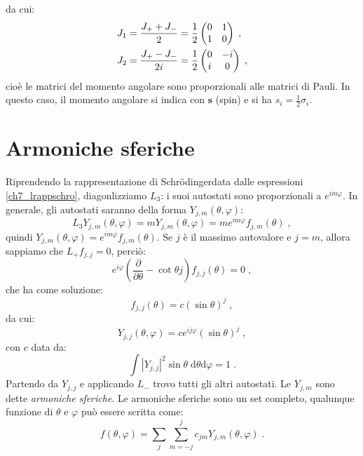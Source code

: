 \documentclass[12pt,a4paper]{report}
\theoremstyle{definition}
\numberwithin{equation}{section}
\newcommand{\diff}[1][]{\mathrm{d}#1}
\newcommand{\Sch}{Schrödinger}
\begin{document}
da cui:
\begin{align}
J_1=\frac{J_+ +J_-}{2}&=\frac{1}{2}\left(\begin{matrix}
0 & 1 \\
1 & 0
\end{matrix}\right)\;, \notag \\
J_2=\frac{J_+ - J_-}{2i}&=\frac{1}{2}\left(\begin{matrix}
0 & -i \\
i & 0
\end{matrix}\right)\;,
\end{align}
cioè le matrici del momento angolare sono proporzionali alle matrici di Pauli. In questo caso, il momento angolare si indica con $\mathbf{s}$ (spin) e si ha $s_i=\frac{1}{2}\sigma_i$.
\section{Armoniche sferiche}
Riprendendo la rappresentazione di \Sch data dalle espressioni \eqref{ch7_lrappschro}, diagonlizziamo $L_3$: i suoi autostati sono proporzionali a $e^{im\varphi}$. In generale, gli autostati saranno della forma $Y_{j,m}(\theta,\varphi)$:
\begin{equation}
L_3Y_{j,m}(\theta,\varphi)=mY_{j,m}(\theta,\varphi)=me^{im\varphi}f_{j,m}(\theta)\;,
\end{equation}
quindi $Y_{j,m}(\theta,\varphi)=e^{im\varphi}f_{j,m}(\theta)$. Se $j$ è il massimo autovalore e $j=m$, allora sappiamo che $L_+f_{j,j}=0$, perciò:
\begin{equation}
e^{i\varphi}\left(\frac{\partial}{\partial\theta}-\cot\theta j\right)f_{j,j}(\theta)=0\;,
\end{equation}
che ha come soluzione:
\begin{equation}
f_{j,j}(\theta)=c(\sin\theta)^j\;,
\end{equation}
da cui:
\begin{equation}
Y_{j,j}(\theta,\varphi)=ce^{ij\varphi}(\sin\theta)^j\;,
\end{equation}
con $c$ data da:
\begin{equation}
\int |Y_{j,j}|^2\sin\theta\;\diff{\theta}\diff{\varphi}=1\;.
\end{equation}
Partendo da $Y_{j,j}$ e applicando $L_-$ trovo tutti gli altri autostati. Le $Y_{j,m}$ sono dette \textit{armoniche sferiche}. Le armoniche sferiche sono un set completo, qualunque funzione di $\theta$ e $\varphi$ può essere scritta come:
\begin{equation}
f(\theta,\varphi)=\sum_j\sum_{m=-j}^j c_{jm}Y_{j,m}(\theta,\varphi)\;.
\end{equation}
\end{document}
